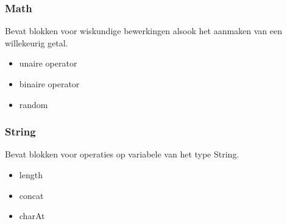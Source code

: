 \documentclass[]{article}
\begin{document}
\subsubsection{Math}
Bevat blokken voor wiskundige bewerkingen alsook het aanmaken van een willekeurig getal.
\begin{itemize}
\item unaire operator
\item binaire operator
\item random
\end{itemize}
\subsubsection{String}
Bevat blokken voor operaties op variabele van het type String.
\begin{itemize}
\item length
\item concat
\item charAt
\end{itemize}
\end{document}
